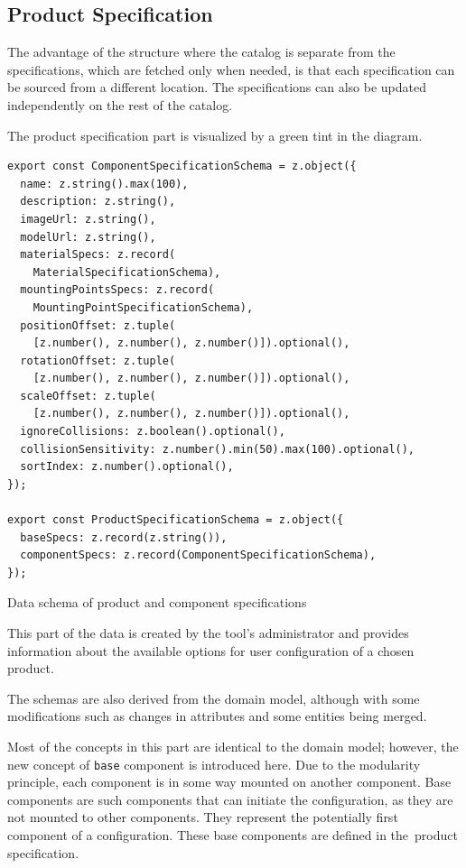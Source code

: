 \subsection{Product Specification}

The advantage of the structure where the catalog is separate from the specifications, which are fetched only when needed, is that each specification can be sourced from a different location. The specifications can also be updated independently on the rest of the catalog.

The product specification part is visualized by a green tint in the  diagram.  

\begin{listing}[h]
\begin{verbatim}
export const ComponentSpecificationSchema = z.object({
  name: z.string().max(100),
  description: z.string(),
  imageUrl: z.string(),
  modelUrl: z.string(),
  materialSpecs: z.record(
    MaterialSpecificationSchema),
  mountingPointsSpecs: z.record(
    MountingPointSpecificationSchema),
  positionOffset: z.tuple(
    [z.number(), z.number(), z.number()]).optional(),
  rotationOffset: z.tuple(
    [z.number(), z.number(), z.number()]).optional(),
  scaleOffset: z.tuple(
    [z.number(), z.number(), z.number()]).optional(),
  ignoreCollisions: z.boolean().optional(),
  collisionSensitivity: z.number().min(50).max(100).optional(),
  sortIndex: z.number().optional(),
});

export const ProductSpecificationSchema = z.object({
  baseSpecs: z.record(z.string()),
  componentSpecs: z.record(ComponentSpecificationSchema),
});
\end{verbatim}
\caption{Data schema of product and component specifications}
\label{lisiting:schema-componentspecification}
\end{listing}

This part of the data is created by the tool's administrator and provides information about the available options for user configuration of a chosen product.

The schemas are also derived from the domain model, although with some modifications such as changes in attributes and some entities being merged.

Most of the concepts in this part are identical to the domain model; however, the new concept of \texttt{base} component is introduced here. Due to the modularity principle, each component is in some way mounted on another component. Base components are such components that can initiate the configuration, as they are not mounted to other components. They represent the potentially first component of a configuration. These base components are defined in the~product specification.

